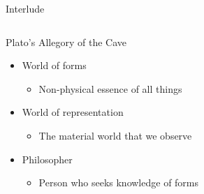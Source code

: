 \documentclass[aspectratio=169]{../latex_main/tntbeamer}  %
\begin{document}
\begin{frame}{Interlude}
\begin{columns}
	        \begin{column}{.3\textwidth}
	            Plato’s Allegory of the Cave\\
	            \begin{itemize}
	                \item World of forms
	                \begin{itemize}
	                    \item Non-physical essence of all things
	                \end{itemize}
	                \item World of representation
	                \begin{itemize}
	                    \item The material world that we observe
	                \end{itemize}
	                \item Philosopher
	                \begin{itemize}
	                    \item Person who seeks knowledge of forms           
	                \end{itemize}
	            \end{itemize}
	        \end{column}
	        \end{columns}
	    
	\end{frame}
	
\end{document}
